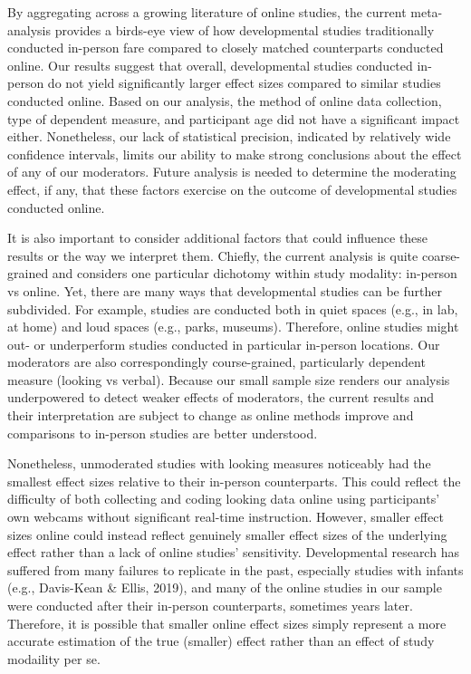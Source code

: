 \documentclass[
  man,floatsintext]{apa6}
\begin{document}
By aggregating across a growing literature of online studies, the current meta-analysis provides a birds-eye view of how developmental studies traditionally conducted in-person fare compared to closely matched counterparts conducted online. Our results suggest that overall, developmental studies conducted in-person do not yield significantly larger effect sizes compared to similar studies conducted online. Based on our analysis, the method of online data collection, type of dependent measure, and participant age did not have a significant impact either. Nonetheless, our lack of statistical precision, indicated by relatively wide confidence intervals, limits our ability to make strong conclusions about the effect of any of our moderators. Future analysis is needed to determine the moderating effect, if any, that these factors exercise on the outcome of developmental studies conducted online.

It is also important to consider additional factors that could influence these results or the way we interpret them. Chiefly, the current analysis is quite coarse-grained and considers one particular dichotomy within study modality: in-person vs online. Yet, there are many ways that developmental studies can be further subdivided. For example, studies are conducted both in quiet spaces (e.g., in lab, at home) and loud spaces (e.g., parks, museums). Therefore, online studies might out- or underperform studies conducted in particular in-person locations. Our moderators are also correspondingly course-grained, particularly dependent measure (looking vs verbal). Because our small sample size renders our analysis underpowered to detect weaker effects of moderators, the current results and their interpretation are subject to change as online methods improve and comparisons to in-person studies are better understood.

Nonetheless, unmoderated studies with looking measures noticeably had the smallest effect sizes relative to their in-person counterparts. This could reflect the difficulty of both collecting and coding looking data online using participants' own webcams without significant real-time instruction. However, smaller effect sizes online could instead reflect genuinely smaller effect sizes of the underlying effect rather than a lack of online studies' sensitivity. Developmental research has suffered from many failures to replicate in the past, especially studies with infants (e.g., Davis-Kean \& Ellis, 2019), and many of the online studies in our sample were conducted after their in-person counterparts, sometimes years later. Therefore, it is possible that smaller online effect sizes simply represent a more accurate estimation of the true (smaller) effect rather than an effect of study modaility per se.
\end{document}
